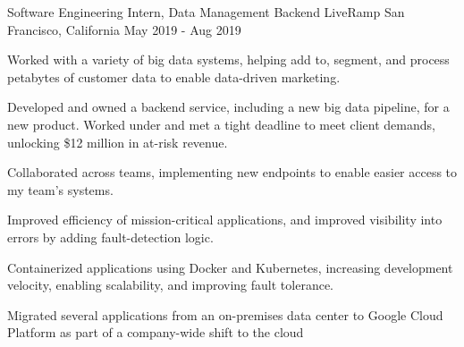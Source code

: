 

\begin{cventries}

    \cventry
      {Software Engineering Intern, Data Management Backend}
      {LiveRamp}
      {San Francisco, California}
      {May 2019 - Aug 2019}
      {
        \begin{cvitems}
          \item Worked with a variety of big data systems, helping add to, segment, and process petabytes of customer data to enable data-driven marketing.
          \item Developed and owned a backend service, including a new big data pipeline, for a new product. Worked under and met a tight deadline to meet client demands, unlocking \$12 million in at-risk revenue.
          \item Collaborated across teams, implementing new endpoints to enable easier access to my team's systems.
          \item Improved efficiency of mission-critical applications, and improved visibility into errors by adding fault-detection logic.
          \item Containerized applications using Docker and Kubernetes, increasing development velocity, enabling scalability, and improving fault tolerance.         
          \item Migrated several applications from an on-premises data center to Google Cloud Platform as part of a company-wide shift to the cloud
        \end{cvitems}
      }


\end{cventries}
